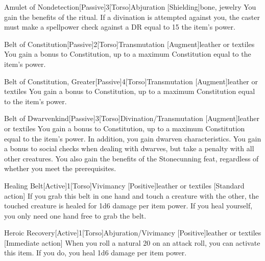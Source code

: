 \begin{magicitemdef}{Amulet of Nondetection}[Passive]{3}[Torso]{Abjuration [Shielding]}{bone, jewelry}
     You gain the benefits of the  ritual.
    If a divination is attempted against you, the caster must make a spellpower check against a DR equal to 15 \add the item's power.
\end{magicitemdef}

\begin{magicitemdef}{Belt of Constitution}[Passive]{2}[Torso]{Transmutation [Augment]}{leather or textiles}
     You gain a  bonus to Constitution, up to a maximum Constitution equal to the item's power.
\end{magicitemdef}

\begin{magicitemdef}{Belt of Constitution, Greater}[Passive]{4}[Torso]{Transmutation [Augment]}{leather or textiles}
     You gain a  bonus to Constitution, up to a maximum Constitution equal to the item's power.
\end{magicitemdef}

\begin{magicitemdef}{Belt of Dwarvenkind}[Passive]{3}[Torso]{Divination/Transmutation [Augment]}{leather or textiles}
     You gain a  bonus to Constitution, up to a maximum Constitution equal to the item's power.
    In addition, you gain dwarven characteristics.
    You gain a  bonus to social checks when dealing with dwarves, but take a  penalty with all other creatures.
    You also gain the benefits of the Stonecunning feat, regardless of whether you meet the prerequisites.
\end{magicitemdef}

\begin{magicitemdef}{Healing Belt}[Active]{1}[Torso]{Vivimancy [Positive]}{leather or textiles}
    [Standard action] If you grab this belt in one hand and touch a creature with the other, the touched creature is healed for 1d6 damage per item power.
    If you heal yourself, you only need one hand free to grab the belt.
\end{magicitemdef}

\begin{magicitemdef}{Heroic Recovery}[Active]{1}[Torso]{Abjuration/Vivimancy [Positive]}{leather or textiles}
    [Immediate action] When you roll a natural 20 on an attack roll, you can activate this item. If you do, you heal 1d6 damage per item power.
\end{magicitemdef}


